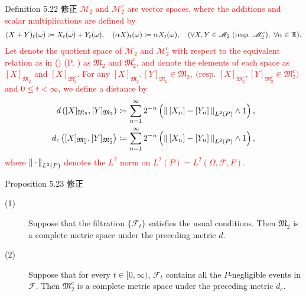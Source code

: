 	\begin{itembox}[l]{Definition 5.22 修正}
		\textcolor{red}{$\mathscr{M}_2$ and $\mathscr{M}_2^c$ are vector spaces, 
		where the additions and scalar multiplications are defined by
		\begin{align}
			(X+Y)_t(\omega) \coloneqq X_t(\omega) + Y_t(\omega),
			\quad (\alpha X)_t(\omega) \coloneqq \alpha X_t(\omega),
			\quad (\forall X,Y \in \mathscr{M}_2\ \mbox{(resp. $\mathscr{M}_2^c$)},\ \forall \alpha \in \mathbb{R}).
		\end{align}
		Let denote the quotient space of $\mathscr{M}_2$ and $\mathscr{M}_2^c$ with respect to
		the equivalent relation as in ()
		(P. \pageref{eq:equivalence_with_respect_to_path}) as $\mathfrak{M}_2$ and $\mathfrak{M}_2^c$,
		and denote the elements of each space as $[X]_{\mathfrak{M}_2}$ and  $[X]_{\mathfrak{M}_2^c}$.
		For any $[X]_{\mathfrak{M}_2},[Y]_{\mathfrak{M}_2} \in \mathfrak{M}_2,\ 
		\mbox{(resp. $[X]_{\mathfrak{M}_2^c},[Y]_{\mathfrak{M}_2^c} \in \mathfrak{M}_2^c$)}$
		and $0 \leq t < \infty$, we define a distance by
		\begin{align}
			d\left([X]_{\mathfrak{M}_2},[Y]_{\mathfrak{M}_2}\right)
			&\coloneqq \sum_{n=1}^\infty 2^{-n}\left(\left\|\, [X_n] - [Y_n]\, \right\|_{L^2(P)} \wedge 1\right), \\
			d_c\left([X]_{\mathfrak{M}_2^c},[Y]_{\mathfrak{M}_2^c}\right)
			&\coloneqq \sum_{n=1}^\infty 2^{-n}\left(\left\|\, [X_n] - [Y_n]\, \right\|_{L^2(P)} \wedge 1\right),
		\end{align}
		where $\left\|\, \cdot\, \right\|_{L^2(P)}$ denotes the $L^2$ norm on $L^2(P) = L^2(\Omega,\mathscr{F},P)$.}
	\end{itembox}
	
	\begin{itembox}[l]{Proposition 5.23 修正}
		\begin{description}
			\item[(1)]
				Suppose that the filtration $\{\mathscr{F}_t\}$ satisfies the usual conditions.
				Then $\mathfrak{M}_2$ is a complete metric space under the preceding metric $d$.
			\item[(2)]
				Suppose that for every $t \in [0,\infty)$,
				$\mathscr{F}_t$ contains all the $P$-negligible events in $\mathscr{F}$.
				Then $\mathfrak{M}_2^c$ is a complete metric space under the preceding metric $d_c$.
		\end{description}
	\end{itembox}